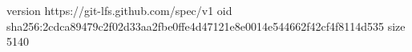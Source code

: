 version https://git-lfs.github.com/spec/v1
oid sha256:2cdca89479c2f02d33aa2fbe0ffe4d47121e8e0014e544662f42cf4f8114d535
size 5140

